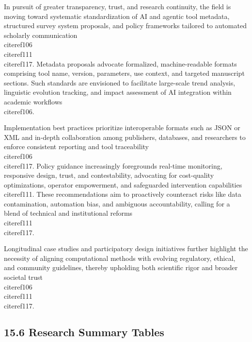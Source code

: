 \documentclass[11pt]{article}
\begin{document}
In pursuit of greater transparency, trust, and research continuity, the field is moving toward systematic standardization of AI and agentic tool metadata, structured survey system proposals, and policy frameworks tailored to automated scholarly communication~\\cite{ref106}\\cite{ref111}\\cite{ref117}. Metadata proposals advocate formalized, machine-readable formats comprising tool name, version, parameters, use context, and targeted manuscript sections. Such standards are envisioned to facilitate large-scale trend analysis, linguistic evolution tracking, and impact assessment of AI integration within academic workflows~\\cite{ref106}.

Implementation best practices prioritize interoperable formats such as JSON or XML and in-depth collaboration among publishers, databases, and researchers to enforce consistent reporting and tool traceability~\\cite{ref106}\\cite{ref117}. Policy guidance increasingly foregrounds real-time monitoring, responsive design, trust, and contestability, advocating for cost-quality optimizations, operator empowerment, and safeguarded intervention capabilities~\\cite{ref111}. These recommendations aim to proactively counteract risks like data contamination, automation bias, and ambiguous accountability, calling for a blend of technical and institutional reforms~\\cite{ref111}\\cite{ref117}.

Longitudinal case studies and participatory design initiatives further highlight the necessity of aligning computational methods with evolving regulatory, ethical, and community guidelines, thereby upholding both scientific rigor and broader societal trust~\\cite{ref106}\\cite{ref111}\\cite{ref117}.

\subsection{15.6 Research Summary Tables}
\end{document}
